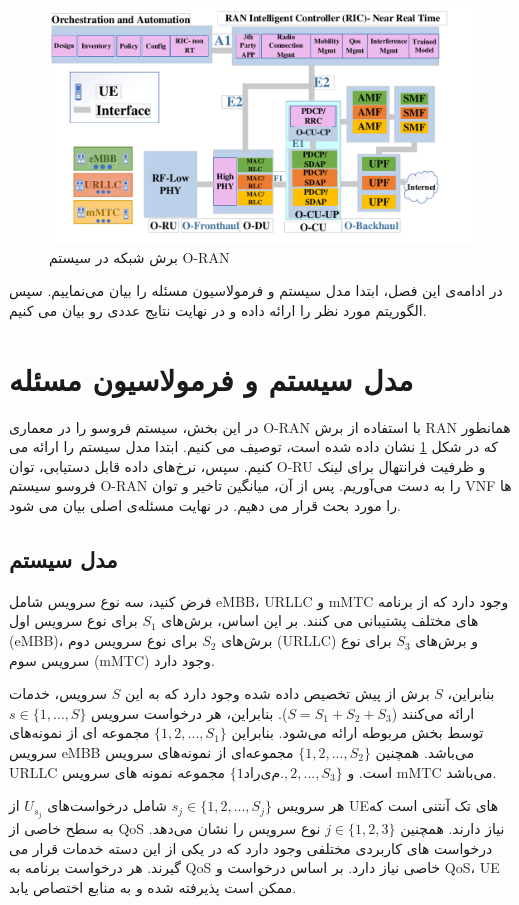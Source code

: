 \begin{figure}
  \centering
  \captionsetup{justification=centering}
    \includegraphics[scale = 0.4]{./img/finalDraw1.pdf}
  \caption{برش شبکه در سیستم O-RAN}
  \label{fig:c11}
\end{figure}
در ادامه‌ی این فصل، ابتدا مدل سیستم و فرمولاسیون مسئله را بیان می‌نماییم. سپس الگوریتم مورد نظر را ارائه داده و در نهایت     نتایج عددی رو بیان می کنیم.

\section{مدل سیستم و فرمولاسیون مسئله}\label{systemmodel}
در این بخش، سیستم فروسو  را در معماری O-RAN با استفاده از برش RAN همانطور که در شکل \ref{fig:c11} نشان داده شده است، توصیف می کنیم.
ابتدا مدل سیستم را ارائه می کنیم. سپس، نرخ‌های داده قابل دستیابی، توان O-RU و ظرفیت فرانتهال برای لینک فروسو سیستم O-RAN را به دست می‌آوریم. پس از آن، میانگین تاخیر و توان VNF ها را مورد بحث قرار می دهیم.
در نهایت مسئله‌ی اصلی بیان می شود.
\subsection{مدل سیستم}
فرض کنید، سه نوع سرویس شامل eMBB، URLLC و mMTC وجود دارد که از برنامه های مختلف پشتیبانی می کنند.
بر این اساس، برش‌های $S_1$ برای نوع سرویس اول (eMBB)، برش‌های $S_2$ برای نوع سرویس دوم (URLLC) و برش‌های $S_3$ برای نوع سرویس سوم (mMTC) وجود دارد.

بنابراین،  $S$ برش‌ از پیش تخصیص داده شده وجود دارد که به این $S$ سرویس، خدمات ارائه می‌کنند ($S = S_1 + S_2 + S_3$).
بنابراین، هر درخواست سرویس $s\in \{1,\ldots,S\}$ توسط بخش مربوطه ارائه می‌شود.
بنابراین  $\{1,2,...,S_1\}$ 
مجموعه ای از نمونه‌های سرویس 
eMBB
می‌باشد. همچنین
 $\{1,2,...,S_2\}$ 
  مجموعه‌ای از نمونه‌های سرویس  URLLC
  است. 
   و $\{1 داریم. ,2,...,S_3\}$ مجموعه نمونه های سرویس mMTC می‌باشد.
   
   هر سرویس $s_j\in \{1,2,...,S_j\} $ شامل درخواست‌های $U_{s_j}$ از UE‌های تک آنتنی است که به سطح خاصی از QoS نیاز دارند.
   همچنین $j \in \{1,2,3\}$ نوع سرویس را نشان می‌دهد.
   درخواست های کاربردی مختلفی وجود دارد که در یکی از این دسته خدمات قرار می گیرند. هر درخواست برنامه به QoS خاصی نیاز دارد. بر اساس درخواست و QoS، UE ممکن است پذیرفته شده و به منابع اختصاص یابد.
   
   
   
   
   
   
   